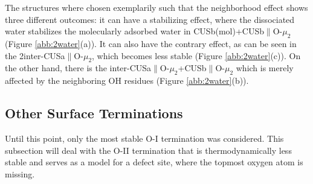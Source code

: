 \documentclass[11pt,DIV=13,BCOR=5mm,a4paper,headinclude]{scrbook}
\begin{document}
The structures where chosen exemplarily such that the neighborhood effect shows three different outcomes: it can have a stabilizing effect, where the dissociated water stabilizes the molecularly adsorbed water in CUSb(mol)+CUSb$\parallel$O-$\mu_2$ (Figure \ref{abb:2water}(a)).
It can also have the contrary effect, as can be seen in the  2inter-CUSa$\parallel$O-$\mu_2$, which becomes less stable (Figure \ref{abb:2water}(c)).
On the other hand, there is the inter-CUSa$\parallel$O-$\mu_2$+CUSb$\parallel$O-$\mu_2$ which is merely affected by the neighboring OH residues (Figure \ref{abb:2water}(b)).

\subsection{Other Surface Terminations}\label{O-II-term}
Until this point, only the most stable O-I termination was considered.
This subsection will deal with the O-II termination that is thermodynamically less stable and serves as a model for a defect site, where the topmost oxygen atom is missing.
\end{document}
